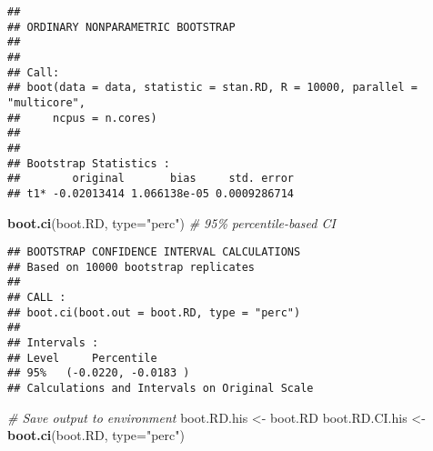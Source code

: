 \documentclass[
]{article}
\newenvironment{Shaded}{\begin{snugshade}}{\end{snugshade}}
\newcommand{\AttributeTok}[1]{\textcolor[rgb]{0.13,0.29,0.53}{#1}}
\newcommand{\CommentTok}[1]{\textcolor[rgb]{0.56,0.35,0.01}{\textit{#1}}}
\newcommand{\FunctionTok}[1]{\textcolor[rgb]{0.13,0.29,0.53}{\textbf{#1}}}
\newcommand{\NormalTok}[1]{#1}
\newcommand{\OtherTok}[1]{\textcolor[rgb]{0.56,0.35,0.01}{#1}}
\newcommand{\StringTok}[1]{\textcolor[rgb]{0.31,0.60,0.02}{#1}}
\begin{document}
\begin{verbatim}
## 
## ORDINARY NONPARAMETRIC BOOTSTRAP
## 
## 
## Call:
## boot(data = data, statistic = stan.RD, R = 10000, parallel = "multicore", 
##     ncpus = n.cores)
## 
## 
## Bootstrap Statistics :
##        original       bias     std. error
## t1* -0.02013414 1.066138e-05 0.0009286714
\end{verbatim}

\begin{Shaded}
\begin{Highlighting}[]
\FunctionTok{boot.ci}\NormalTok{(boot.RD, }\AttributeTok{type=}\StringTok{"perc"}\NormalTok{) }\CommentTok{\# 95\% percentile{-}based CI}
\end{Highlighting}
\end{Shaded}

\begin{verbatim}
## BOOTSTRAP CONFIDENCE INTERVAL CALCULATIONS
## Based on 10000 bootstrap replicates
## 
## CALL : 
## boot.ci(boot.out = boot.RD, type = "perc")
## 
## Intervals : 
## Level     Percentile     
## 95%   (-0.0220, -0.0183 )  
## Calculations and Intervals on Original Scale
\end{verbatim}

\begin{Shaded}
\begin{Highlighting}[]
\CommentTok{\# Save output to environment}
\NormalTok{boot.RD.his }\OtherTok{\textless{}{-}}\NormalTok{ boot.RD}
\NormalTok{boot.RD.CI.his }\OtherTok{\textless{}{-}} \FunctionTok{boot.ci}\NormalTok{(boot.RD, }\AttributeTok{type=}\StringTok{"perc"}\NormalTok{) }
\end{Highlighting}
\end{Shaded}
\end{document}
